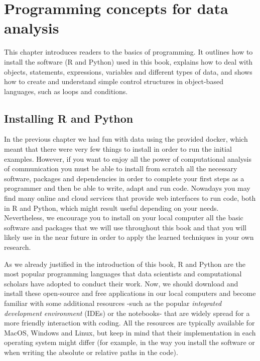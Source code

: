\chapter{Programming concepts for data analysis}

This chapter introduces readers to the basics of programming. It outlines how to install the software (R and Python) used in this book, explains how to deal with objects, statements, expressions, variables and different types of data, and shows how to create and understand simple control structures in object-based languages, such as loops and conditions.

\section{Installing R and Python}

In the previous chapter we had fun with data using the provided docker, which meant that there were very few things to install in order to run the initial examples. However, if you want to enjoy all the power of computational analysis of communication you must be able to install from scratch all the necessary software, packages and dependencies in order to complete your first steps as a programmer and then be able to write, adapt and run code. Nowadays you may find many online and cloud services that provide web interfaces to run code, both in R and Python, which might result useful depending on your needs. Nevertheless, we encourage you to install on your local computer all the basic software and packages that we will use throughout this book and that you will likely use in the near future in order to apply the learned techniques in your own research.  

As we already justified in the introduction of this book, R and Python are the most popular programming languages that data scientists and computational scholars have adopted to conduct their work.  Now, we should download and install these open-source and free applications in our local computers and become familiar with some additional resources -such as the popular \emph{integrated development environment} (IDEs) or the notebooks- that are widely spread for a more friendly interaction with coding. All the resources are typically available for MacOS, Windows and Linux, but keep in mind that their implementation in each operating system might differ (for example, in the way you install the software or when writing the absolute or relative paths in the code). 

